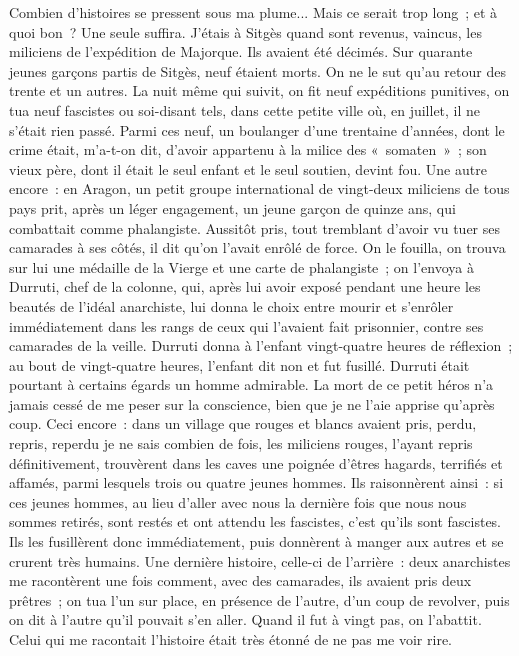 \documentclass[french,twoside]{book} %
\begin{document}
Combien d'histoires se pressent sous ma plume... Mais ce serait trop long ; et à quoi bon ? Une seule suffira. J'étais à Sitgès quand sont revenus, vaincus, les miliciens de l'expédition de Majorque. Ils avaient été décimés. Sur quarante jeunes garçons partis de Sitgès, neuf étaient morts. On ne le sut qu'au retour des trente et un autres. La nuit même qui suivit, on fit neuf expéditions punitives, on tua neuf fascistes ou soi-disant tels, dans cette petite ville où, en juillet, il ne s'était rien passé. Parmi ces neuf, un boulanger d'une trentaine d'années, dont le crime était, m'a-t-on dit, d'avoir appartenu à la milice des « somaten » ; son vieux père, dont il était le seul enfant et le seul soutien, devint fou. Une autre encore : en Aragon, un petit groupe international de vingt-deux miliciens de tous pays prit, après un léger engagement, un jeune garçon de quinze ans, qui combattait comme phalangiste. Aussitôt pris, tout tremblant d'avoir vu tuer ses camarades à ses côtés, il dit qu'on l'avait enrôlé de force. On le fouilla, on trouva sur lui une médaille de la Vierge et une carte de phalangiste ; on l'envoya à Durruti, chef de la colonne, qui, après lui avoir exposé pendant une heure les beautés de l'idéal anarchiste, lui donna le choix entre mourir et s'enrôler immédiatement dans les rangs de ceux qui l'avaient fait prisonnier, contre ses camarades de la veille. Durruti donna à l'enfant vingt-quatre heures de réflexion ; au bout de vingt-quatre heures, l'enfant dit non et fut fusillé. Durruti était pourtant à certains égards un homme admirable. La mort de ce petit héros n'a jamais cessé de me peser sur la conscience, bien que je ne l'aie apprise qu'après coup. Ceci encore : dans un village que rouges et blancs avaient pris, perdu, repris, reperdu je ne sais combien de fois, les miliciens rouges, l'ayant repris définitivement, trouvèrent dans les caves une poignée d'êtres hagards, terrifiés et affamés, parmi lesquels trois ou quatre jeunes hommes. Ils raisonnèrent ainsi : si ces jeunes hommes, au lieu d'aller avec nous la dernière fois que nous nous sommes retirés, sont restés et ont attendu les fascistes, c'est qu'ils sont fascistes. Ils les fusillèrent donc immé­diatement, puis donnèrent à manger aux autres et se crurent très humains. Une dernière histoire, celle-ci de l'arrière : deux anarchistes me racontèrent une fois comment, avec des camarades, ils avaient pris deux prêtres ; on tua l'un sur place, en présence de l'autre, d'un coup de revolver, puis on dit à l'autre qu'il pouvait s'en aller. Quand il fut à vingt pas, on l'abattit. Celui qui me racontait l'histoire était très étonné de ne pas me voir rire.\par
\end{document}

